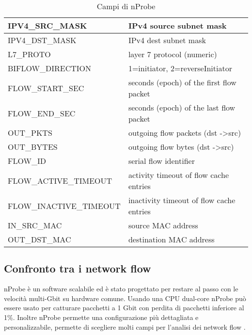 \documentclass[../main.tex]{subfiles}
\begin{document}
\begin{table}[H]
\begin{tabular}{|l|l|}
IPV4\_SRC\_MASK                      & IPv4 source subnet mask                       \\ \hline
IPV4\_DST\_MASK                      & IPv4 dest subnet mask                         \\ \hline
L7\_PROTO                            & layer 7 protocol (numeric)                    \\ \hline
BIFLOW\_DIRECTION                    & 1=initiator, 2=reverseInitiator               \\ \hline
FLOW\_START\_SEC                     & seconds (epoch) of the first flow packet      \\ \hline
FLOW\_END\_SEC                       & seconds (epoch) of the last flow packet       \\ \hline
OUT\_PKTS                            & outgoing flow packets (dst -\textgreater src) \\ \hline
OUT\_BYTES                           & outgoing flow bytes (dst -\textgreater src)   \\ \hline
FLOW\_ID                             & serial flow identifier                        \\ \hline
FLOW\_ACTIVE\_TIMEOUT                & activity timeout of flow cache entries        \\ \hline
FLOW\_INACTIVE\_TIMEOUT              & inactivity timeout of flow cache entries      \\ \hline
IN\_SRC\_MAC                         & source MAC address                            \\ \hline
OUT\_DST\_MAC                        & destination MAC address                       \\ \hline
\end{tabular}\par
				\caption{Campi di nProbe}
\label{table:campiNprobe}
\end{table}

\subsection{Confronto tra i network flow}
nProbe è un software scalabile ed è stato progettato per restare al passo con le velocità multi-Gbit su hardware comune. Usando una CPU dual-core nProbe può essere usato per catturare pacchetti a 1 Gbit con perdita di pacchetti inferiore al 1\%. Inoltre nProbe permette una configurazione più dettagliata e personalizzabile, permette di scegliere molti campi per l'analisi dei network flow \cite{nProbe}.
\end{document}
